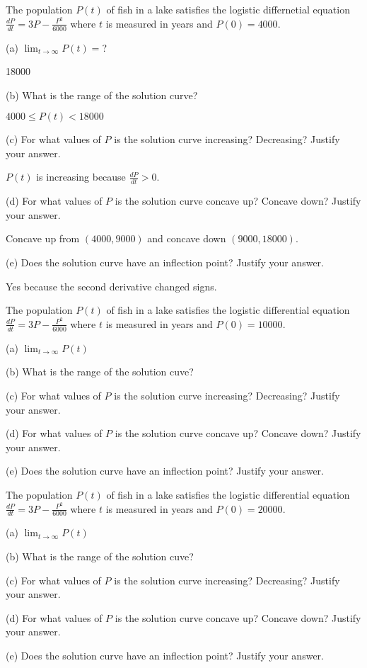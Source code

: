 \documentclass[../bccalc.tex]{subfiles}
\begin{document}
\begin{example}
    The population $P(t)$ of fish in a lake satisfies the logistic differnetial equation $\frac{dP}{dt}=3P-\frac{P^2}{6000}$ where $t$ is measured in years and $P(0)=4000$.

    (a) $\lim_{t\to \infty}P(t)=$?

    18000

    (b) What is the range of the solution curve?

    $4000\leq P(t)<18000$

    (c) For what values of $P$ is the solution curve increasing? Decreasing? Justify your answer.

    $P(t)$ is increasing because $\frac{dP}{dt}>0$.

    (d) For what values of $P$ is the solution curve concave up? Concave down? Justify your answer.

    Concave up from $(4000,9000)$ and concave down $(9000,18000)$.

    (e) Does the solution curve have an inflection point? Justify your answer.

    Yes because the second derivative changed signs.
\end{example}

\ex The population $P(t)$ of fish in a lake satisfies the logistic differential equation $\frac{dP}{dt}=3P-\frac{P^2}{6000}$ where $t$ is measured in years and $P(0)=10000$.

(a) $\lim_{t\to\infty}P(t)$

(b) What is the range of the solution cuve?

(c) For what values of $P$ is the solution curve increasing? Decreasing? Justify your answer.

(d) For what values of $P$ is the solution curve concave up? Concave down? Justify your answer.

(e) Does the solution curve have an inflection point? Justify your answer.

\ex The population $P(t)$ of fish in a lake satisfies the logistic differential equation $\frac{dP}{dt}=3P-\frac{P^2}{6000}$ where $t$ is measured in years and $P(0)=20000$.

(a) $\lim_{t\to\infty}P(t)$

(b) What is the range of the solution cuve?

(c) For what values of $P$ is the solution curve increasing? Decreasing? Justify your answer.

(d) For what values of $P$ is the solution curve concave up? Concave down? Justify your answer.

(e) Does the solution curve have an inflection point? Justify your answer.
\end{document}
